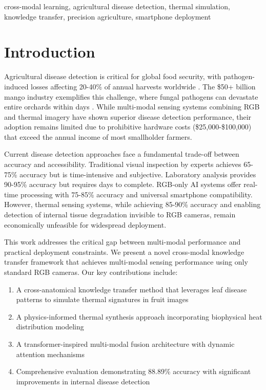 \documentclass[conference]{IEEEtran}
\begin{document}
\begin{IEEEkeywords}
    cross-modal learning, agricultural disease detection, thermal simulation, knowledge transfer, precision agriculture, smartphone deployment
\end{IEEEkeywords}

\section{Introduction}

Agricultural disease detection is critical for global food security, with pathogen-induced losses affecting 20-40\% of annual harvests worldwide \cite{ahmed2023global}. The \$50+ billion mango industry exemplifies this challenge, where fungal pathogens can devastate entire orchards within days \cite{fao2023}. While multi-modal sensing systems combining RGB and thermal imagery have shown superior disease detection performance, their adoption remains limited due to prohibitive hardware costs (\$25,000-\$100,000) that exceed the annual income of most smallholder farmers.

Current disease detection approaches face a fundamental trade-off between accuracy and accessibility. Traditional visual inspection by experts achieves 65-75\% accuracy but is time-intensive and subjective. Laboratory analysis provides 90-95\% accuracy but requires days to complete. RGB-only AI systems offer real-time processing with 75-85\% accuracy and universal smartphone compatibility. However, thermal sensing systems, while achieving 85-90\% accuracy and enabling detection of internal tissue degradation invisible to RGB cameras, remain economically unfeasible for widespread deployment.

This work addresses the critical gap between multi-modal performance and practical deployment constraints. We present a novel cross-modal knowledge transfer framework that achieves multi-modal sensing performance using only standard RGB cameras. Our key contributions include:

\begin{enumerate}
    \item A cross-anatomical knowledge transfer method that leverages leaf disease patterns to simulate thermal signatures in fruit images
    \item A physics-informed thermal synthesis approach incorporating biophysical heat distribution modeling
    \item A transformer-inspired multi-modal fusion architecture with dynamic attention mechanisms
    \item Comprehensive evaluation demonstrating 88.89\% accuracy with significant improvements in internal disease detection
\end{enumerate}
\end{document}

